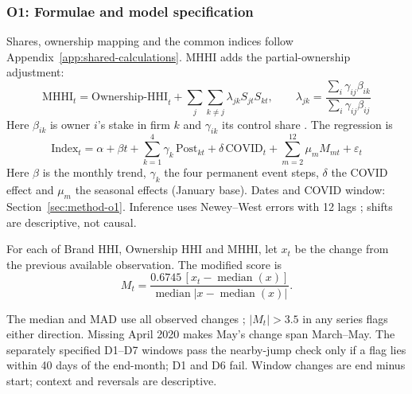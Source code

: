 \subsubsection{O1: Formulae and model specification}
\label{app:review-o1-formulae}
Shares, ownership mapping and the common indices follow Appendix~\ref{app:shared-calculations}. MHHI adds the partial-ownership adjustment:
\begin{equation}
\text{MHHI}_t = \text{Ownership-HHI}_t+\sum_{j}\sum_{k\neq j}\lambda_{jk}S_{jt}S_{kt},\qquad
\lambda_{jk}=\frac{\sum_i \gamma_{ij}\beta_{ik}}{\sum_i \gamma_{ij}\beta_{ij}} \tag{O1.1b}\label{eq:review-o1-mhhi}
\end{equation}
Here $\beta_{ik}$ is owner $i$'s stake in firm $k$ and $\gamma_{ik}$ its control share \parencite{obriensalop2000}. The regression is
\begin{equation}
\text{Index}_t = \alpha + \beta t + \sum_{k=1}^{4}\gamma_k\,\text{Post}_{kt} + \delta\,\text{COVID}_t + \sum_{m=2}^{12}\mu_m M_{mt} + \varepsilon_t \tag{O1.2}\label{eq:review-o1-regression}
\end{equation}
Here $\beta$ is the monthly trend, $\gamma_k$ the four permanent event steps, $\delta$ the COVID effect and $\mu_m$ the seasonal effects (January base). Dates and COVID window: Section~\ref{sec:method-o1}. Inference uses Newey--West errors with 12 lags \parencite{neweywest1987}; shifts are descriptive, not causal.
\begin{samepage}
For each of Brand HHI, Ownership HHI and MHHI, let $x_t$ be the change from the previous available observation. The modified score is
\begingroup
\renewcommand{\theHequation}{review-o1-jump}
\begin{equation}
M_t=\frac{0.6745\,[x_t-\operatorname{median}(x)]}{\operatorname{median}|x-\operatorname{median}(x)|}.
\tag{O1.3}\label{eq:review-o1-jump}
\end{equation}
\endgroup
\par\end{samepage}
The median and MAD use all observed changes \parencite{iglewicz1993outliers}; $|M_t|>3.5$ in any series flags either direction. Missing April 2020 makes May's change span March--May. The separately specified D1--D7 windows pass the nearby-jump check only if a flag lies within 40 days of the end-month; D1 and D6 fail. Window changes are end minus start; context and reversals are descriptive.
